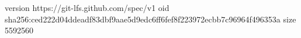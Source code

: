 version https://git-lfs.github.com/spec/v1
oid sha256:ced222d04ddeadf83dbf9aae5d9edc6ff6fef8f223972ecbb7c96964f496353a
size 5592560
